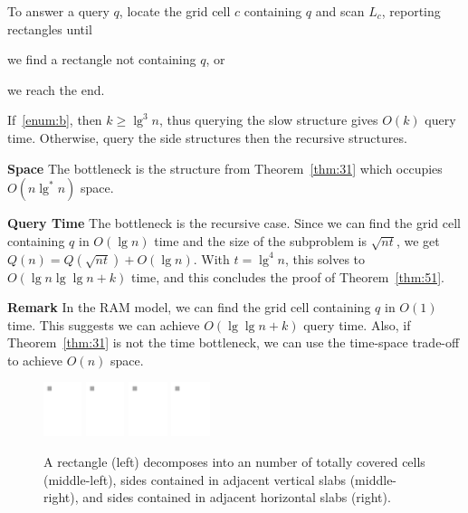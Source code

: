 \documentclass[letterpaper,12pt,twocolumn]{article}
\newcommand{\BigOh}[1]{O\!\left(#1\right)}
\theoremstyle{plain}
\begin{document}
To answer a query $q$, locate the grid cell $c$ containing $q$ and
scan $L_c$, reporting rectangles until
%
\begin{enumerate*}[label=(\alph*)] %
\item\label{enum:a} we find a rectangle not containing $q$, or
\item\label{enum:b} we reach the end.
\end{enumerate*}

If~\ref{enum:b}, then $k \ge \lg^3 n$, thus querying the slow
structure gives $\BigOh{k}$ query time.  Otherwise, query the side
structures then the recursive structures.

\textbf{Space} The bottleneck is the structure from
Theorem~\ref{thm:31} which occupies $\BigOh{n\lg^* n}$ space.

\textbf{Query Time} The bottleneck is the recursive case.  Since we
can find the grid cell containing $q$ in $\BigOh{\lg n}$ time and the
size of the subproblem is $\sqrt{nt}$, we get $Q(n) = Q(\sqrt{nt}) +
\BigOh{\lg n}$.  With $t = \lg^4n$, this solves to $\BigOh{\lg n\lg\lg
  n + k}$ time, and this concludes the proof of Theorem~\ref{thm:51}.

\textbf{Remark} In the RAM model, we can find the grid cell containing
$q$ in $\BigOh{1}$ time.  This suggests we can achieve $\BigOh{\lg\lg
  n + k}$ query time.  Also, if Theorem~\ref{thm:31} is not the time
bottleneck, we can use the time-space trade-off to achieve $\BigOh{n}$
space.

\begin{figure}[t!]
  \centering
    \includegraphics[width=0.10\textwidth,page=1]{figures/grid-decomposition}
    \includegraphics[width=0.10\textwidth,page=2]{figures/grid-decomposition}
    \includegraphics[width=0.10\textwidth,page=4]{figures/grid-decomposition}
    \includegraphics[width=0.10\textwidth,page=3]{figures/grid-decomposition}
  \caption[Grid decomposition]{A rectangle (left) decomposes into an
    number of totally covered cells (middle-left), sides contained in
    adjacent vertical slabs (middle-right), and sides contained in
    adjacent horizontal slabs (right).}\label{fig:grid:decomposition}
\end{figure}



\end{document}
